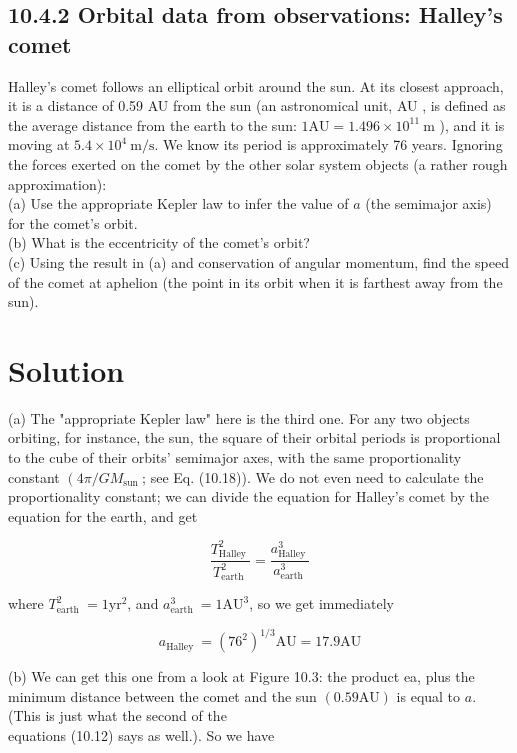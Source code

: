 \documentclass[10pt]{article}
\begin{document}
\subsection*{10.4.2 Orbital data from observations: Halley's comet}
Halley's comet follows an elliptical orbit around the sun. At its closest approach, it is a distance of 0.59 AU from the sun (an astronomical unit, AU , is defined as the average distance from the earth to the sun: $1 \mathrm{AU}=1.496 \times 10^{11} \mathrm{~m}$ ), and it is moving at $5.4 \times 10^{4} \mathrm{~m} / \mathrm{s}$. We know its period is approximately 76 years. Ignoring the forces exerted on the comet by the other solar system objects (a rather rough approximation):\\
(a) Use the appropriate Kepler law to infer the value of $a$ (the semimajor axis) for the comet's orbit.\\
(b) What is the eccentricity of the comet's orbit?\\
(c) Using the result in (a) and conservation of angular momentum, find the speed of the comet at aphelion (the point in its orbit when it is farthest away from the sun).

\section*{Solution}
(a) The "appropriate Kepler law" here is the third one. For any two objects orbiting, for instance, the sun, the square of their orbital periods is proportional to the cube of their orbits' semimajor axes, with the same proportionality constant $\left(4 \pi / G M_{\text {sun }}\right.$; see Eq. (10.18)). We do not even need to calculate the proportionality constant; we can divide the equation for Halley's comet by the equation for the earth, and get


\begin{equation*}
\frac{T_{\text {Halley }}^{2}}{T_{\text {earth }}^{2}}=\frac{a_{\text {Halley }}^{3}}{a_{\text {earth }}^{3}} \tag{10.21}
\end{equation*}


where $T_{\text {earth }}^{2}=1 \mathrm{yr}^{2}$, and $a_{\text {earth }}^{3}=1 \mathrm{AU}^{3}$, so we get immediately


\begin{equation*}
a_{\text {Halley }}=\left(76^{2}\right)^{1 / 3} \mathrm{AU}=17.9 \mathrm{AU} \tag{10.22}
\end{equation*}


(b) We can get this one from a look at Figure 10.3: the product ea, plus the minimum distance between the comet and the sun $(0.59 \mathrm{AU})$ is equal to $a$. (This is just what the second of the\\
equations (10.12) says as well.). So we have
\end{document}
